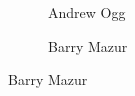 \begin{frame}[plain]
\begin{figure}[h]
\begin{subfigure}{0.3\textwidth}
	\caption{Andrew Ogg}
	\end{subfigure} \hspace{0.05cm}
	\begin{subfigure}{0.3\textwidth}
	\captionsetup{labelformat=empty}
	\centering
	\caption{Barry Mazur}
	\end{subfigure}
	\end{figure}
\end{frame}





